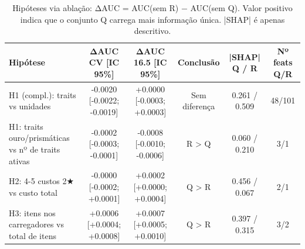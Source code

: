 \begin{table}[htbp]
\caption{Hipóteses via ablação: ΔAUC = AUC(sem R) − AUC(sem Q). Valor positivo indica que o conjunto Q carrega mais informação única. |SHAP| é apenas descritivo.}
\label{tab:hipoteses}
\centering
\small
\begin{tabular}{lccccc}
\toprule
Hipótese & ΔAUC CV [IC 95\%] & ΔAUC 16.5 [IC 95\%] & Conclusão & |SHAP| Q / R & Nº feats Q/R \\
\midrule
H1 (compl.): traits vs unidades & -0.0020 [-0.0022; -0.0019] & +0.0000 [-0.0003; +0.0003] & Sem diferença & 0.261 / 0.509 & 48/101 \\
H1: traits ouro/prismáticas vs nº de traits ativas & -0.0002 [-0.0003; -0.0001] & -0.0008 [-0.0010; -0.0006] & R > Q & 0.060 / 0.210 & 3/1 \\
H2: 4-5 custos 2★ vs custo total & -0.0000 [-0.0002; +0.0001] & +0.0002 [+0.0000; +0.0004] & Q > R & 0.456 / 0.067 & 2/1 \\
H3: itens nos carregadores vs total de itens & +0.0006 [+0.0004; +0.0008] & +0.0007 [+0.0005; +0.0010] & Q > R & 0.397 / 0.315 & 3/2 \\
\bottomrule
\end{tabular}
\end{table}

